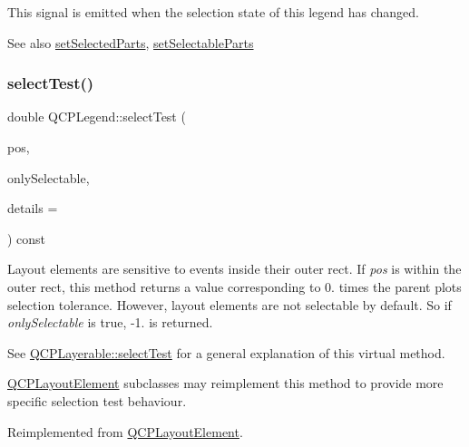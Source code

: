 This signal is emitted when the selection state of this legend has changed.

\begin{DoxySeeAlso}{See also}
\hyperlink{class_q_c_p_legend_a2aee309bb5c2a794b1987f3fc97f8ad8}{set\+Selected\+Parts}, \hyperlink{class_q_c_p_legend_a9ce60aa8bbd89f62ae4fa83ac6c60110}{set\+Selectable\+Parts} 
\end{DoxySeeAlso}
\mbox{\label{class_q_c_p_legend_aa53507624491908fb3d1a514b1fc674e}} 
\subsubsection{\texorpdfstring{select\+Test()}{selectTest()}}
{\footnotesize\ttfamily double Q\+C\+P\+Legend\+::select\+Test (\begin{DoxyParamCaption}\item[{const Q\+PointF \&}]{pos,  }\item[{bool}]{only\+Selectable,  }\item[{Q\+Variant $\ast$}]{details = {} }\end{DoxyParamCaption}) const\hspace{0.3cm}{\ttfamily [virtual]}}

Layout elements are sensitive to events inside their outer rect. If {\itshape pos} is within the outer rect, this method returns a value corresponding to 0. times the parent plot\textquotesingle{}s selection tolerance. However, layout elements are not selectable by default. So if {\itshape only\+Selectable} is true, -\/1. is returned.

See \hyperlink{class_q_c_p_layerable_a04db8351fefd44cfdb77958e75c6288e}{Q\+C\+P\+Layerable\+::select\+Test} for a general explanation of this virtual method.

\hyperlink{class_q_c_p_layout_element}{Q\+C\+P\+Layout\+Element} subclasses may reimplement this method to provide more specific selection test behaviour. 

Reimplemented from \hyperlink{class_q_c_p_layout_element_ae97f483cccedadbf18ea4525ef240ee4}{Q\+C\+P\+Layout\+Element}.

\mbox{\label{class_q_c_p_legend_a866a9e3f5267de7430a6c7f26a61db9f}} 
